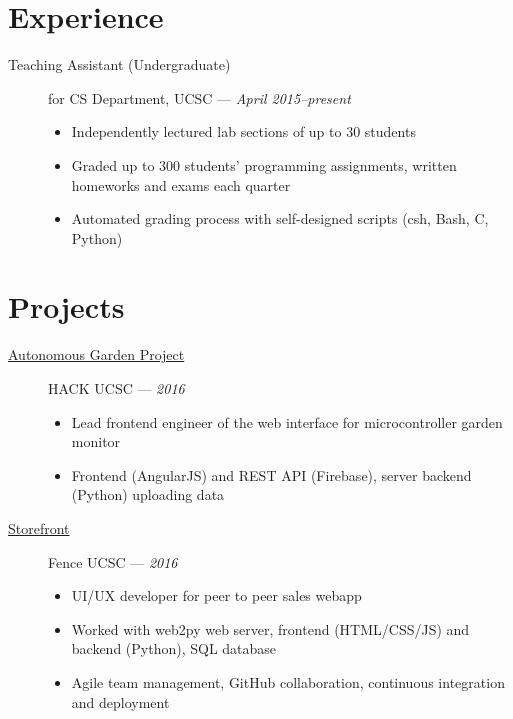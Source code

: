 \documentclass[11pt]{article}
\begin{document}
\section*{Experience}
\begin{description}
  \item[Teaching Assistant (Undergraduate)] for CS Department, UCSC ---
    \textit{April 2015--present}
    \begin{itemize}
      \item Independently lectured lab sections of up to $30$ students
      \item Graded up to $300$ students' programming assignments, written
        homeworks and exams each quarter
      \item Automated grading process with self-designed scripts (csh, Bash, C,
        Python)
    \end{itemize}
\end{description}

\section*{Projects}
\begin{description}
  \item[\href{https://github.com/4U6U57/hackucsc2016.autogarden}{Autonomous
    Garden Project}] HACK UCSC --- \textit{2016}
    \begin{itemize}
      \item Lead frontend engineer of the web interface for microcontroller
        garden monitor
      \item Frontend (AngularJS) and REST API (Firebase), server backend
        (Python) uploading data
    \end{itemize}
  \item[\href{https://github.com/Fence-UCSC/Storefront}{Storefront}]
    Fence UCSC --- \textit{2016}
    \begin{itemize}
      \item UI/UX developer for peer to peer sales webapp
      \item Worked with web2py web server, frontend (HTML/CSS/JS) and
        backend (Python), SQL database
      \item Agile team management, GitHub collaboration, continuous
        integration and deployment
    \end{itemize}
\end{description}
\end{document}
